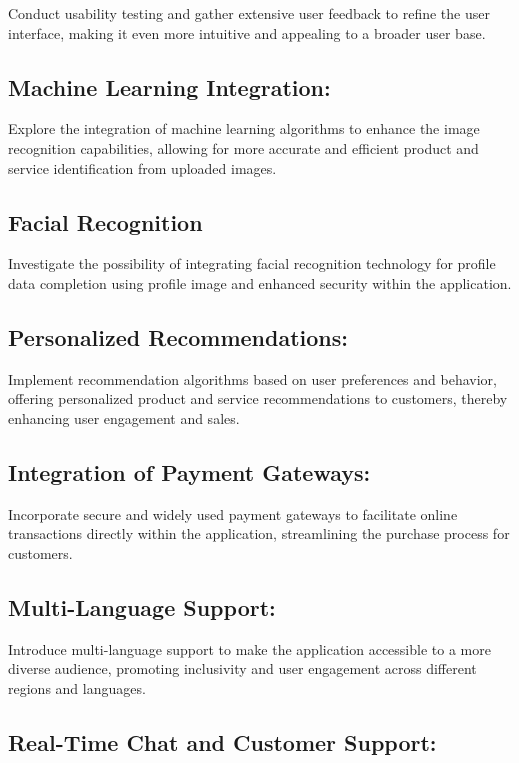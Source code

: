 Conduct usability testing and gather extensive user feedback to refine the user interface, making it even more intuitive and appealing to a broader user base.

\subsection{Machine Learning Integration:}

Explore the integration of machine learning algorithms to enhance the image recognition capabilities, allowing for more accurate and efficient product and service identification from uploaded images.

\subsection{Facial Recognition}
Investigate the possibility of integrating facial recognition technology for profile data completion using profile image and enhanced security within the application.

\subsection{Personalized Recommendations:}

Implement recommendation algorithms based on user preferences and behavior, offering personalized product and service recommendations to customers, thereby enhancing user engagement and sales.

\subsection{Integration of Payment Gateways:}

Incorporate secure and widely used payment gateways to facilitate online transactions directly within the application, streamlining the purchase process for customers.

\subsection{Multi-Language Support:}

Introduce multi-language support to make the application accessible to a more diverse audience, promoting inclusivity and user engagement across different regions and languages.

\subsection{Real-Time Chat and Customer Support:}

